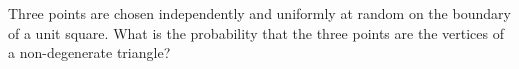 Three points are chosen independently and uniformly at random on the boundary of a unit square. What is the probability that the three points are the vertices of a non-degenerate triangle?
